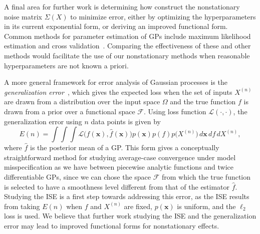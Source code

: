 \documentclass{article}
\renewcommand{\vec}[1]{\mathbf{#1}}
\numberwithin{equation}{section}
\begin{document}
A final area for further work is determining how construct the nonstationary noise matrix $\Sigma(X)$ to minimize error, either by optimizing the hyperparameters in its current exponential form, or deriving an improved functional form. Common methods for parameter estimation of GPs include maximum likelihood estimation and cross validation~\cite{rasmussen2003gaussian}. Comparing the effectiveness of these and other methods would facilitate the use of our nonstationary methods when reasonable hyperparameters are not known a priori.

A more general framework for error analysis of Gaussian processes is the \textit{generalization error}~\cite{rasmussen2003gaussian, sollich1999learning}, which gives the expected loss when the set of inputs $X^{(n)}$ are drawn from a distribution over the input space $\Omega$ and the true function $f$ is drawn from a prior over a functional space $\mathcal{F}$. Using loss function $\mathcal{L}(\cdot, \cdot)$, the generalization error using $n$ data points is given by
$$ E(n) = \int \int \int \mathcal{L}\Big(f(\vec{x}), \hat{f}(\vec{x})\Big) p(\vec{x}) p(f) p\big(X^{(n)}\big) \, d\vec{x} \, df \,  dX^{(n)},$$
where $\hat{f}$ is the posterior mean of a GP. This form gives a conceptually straightforward method for studying average-case convergence under model misspecification as we have between piecewise analytic functions and twice differentiable GPs, since we can chose the space $\mathcal{F}$ from which the true function is selected to have a smoothness level different from that of the estimator $\hat{f}$. Studying the ISE is a first step towards addressing this error, as the ISE results from taking $E(n)$ when $f$ and $X^{(n)}$ are fixed, $p(\vec{x})$ is uniform, and the $\ell_2$ loss is used. We believe that further work studying the ISE and the generalization error may lead to improved functional forms for nonstationary effects.

\newpage

{}

\end{document}
